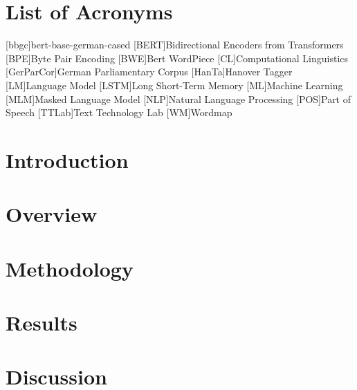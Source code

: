 \documentclass[12pt, a4paper, english]{ttlab-qualify}
\begin{document}
    \chapter*{List of Acronyms}
    \begin{acronym}
        [bbgc]{bert-base-german-cased}
        [BERT]{Bidirectional Encoders from Transformers}
        [BPE]{Byte Pair Encoding}
        [BWE]{Bert WordPiece}
        [CL]{Computational Linguistics}
        [GerParCor]{German Parliamentary Corpus}
        [HanTa]{Hanover Tagger}
        [LM]{Language Model}
        [LSTM]{Long Short-Term Memory}
        [ML]{Machine Learning}
        [MLM]{Masked Language Model}
        [NLP]{Natural Language Processing}
        [POS]{Part of Speech}
        [TTLab]{Text Technology Lab}
        [WM]{Wordmap}

    \end{acronym}

    \cleardoubleoddpage


    \chapter{Introduction}
    \label{ch:introduction}

    \chapter{Overview}
    \label{ch:overview}
    


    \chapter{Methodology}
    \label{ch:methodology}


    \chapter{Results}
    \label{ch:results}


    \chapter{Discussion}
    \label{ch:discussion}
\end{document}
